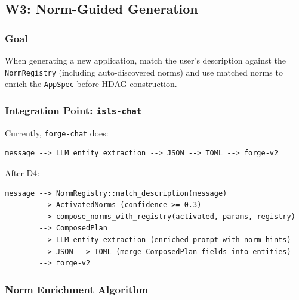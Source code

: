 \documentclass[11pt,a4paper]{article}
\begin{document}
\subsection{W3: Norm-Guided Generation}
\label{sec:w3}

\subsubsection{Goal}

When generating a new application, match the user's description against 
the \texttt{NormRegistry} (including auto-discovered norms) and use 
matched norms to enrich the \texttt{AppSpec} before HDAG construction.

\subsubsection{Integration Point: \texttt{isls-chat}}

Currently, \texttt{forge-chat} does:

\begin{lstlisting}[style=bash]
message --> LLM entity extraction --> JSON --> TOML --> forge-v2
\end{lstlisting}

After D4:

\begin{lstlisting}[style=bash]
message --> NormRegistry::match_description(message)
        --> ActivatedNorms (confidence >= 0.3)
        --> compose_norms_with_registry(activated, params, registry)
        --> ComposedPlan
        --> LLM entity extraction (enriched prompt with norm hints)
        --> JSON --> TOML (merge ComposedPlan fields into entities)
        --> forge-v2
\end{lstlisting}

\subsubsection{Norm Enrichment Algorithm}
\end{document}
